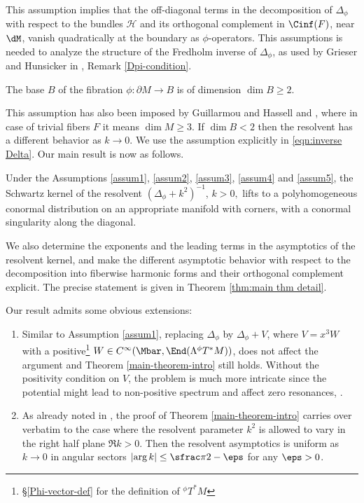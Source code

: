 This assumption implies that the off-diagonal terms in the decomposition of $\Delta_{\phi}$ with respect to the bundles $\mathscr{H}$ and its orthogonal complement in $\Cinf(F)$, near $\dM$, vanish quadratically at the boundary as $\phi$-operators. This assumptions is needed to analyze the structure of the Fredholm inverse of $\Delta_{\phi}$, as
used by Grieser and Hunsicker in \cite[Th.\,2]{grieser-para}, \cf Remark \ref{Dpi-condition}.

\begin{assum}\label{assum5}
The base $B$ of the fibration $\phi: \partial M \!\to\! B$ is of dimension \hbox{$\dim B \!\geq\! 2$}.
\end{assum}

This assumption has also been imposed by Guillarmou and Hassell
\cite{guillarmou2008resolvent} and \cite{guillarmou2009resolvent}, where
in case of trivial fibers $F$ it means $\dim M \geq 3$. If $\dim B<2$ then the resolvent has a different behavior as $k\to0$. We use the assumption explicitly in \eqref{eqn:inverse Delta}. Our main result is now as follows.

\begin{Th}\label{main-theorem-intro}
Under the Assumptions \ref{assum1}, \ref{assum2}, \ref{assum3}, \ref{assum4} and \ref{assum5},
the Schwartz kernel of the resolvent
$(\Delta_{\phi} + k^{2})^{-1}$, $k>0,$ lifts to a polyhomogeneous conormal
distribution on an appropriate manifold with corners,
with a conormal singularity along the diagonal.
\end{Th}
We also determine the exponents and the leading terms in the asymptotics of the resolvent kernel, and make the different asymptotic behavior with respect to the decomposition into fiberwise harmonic forms and their orthogonal complement explicit. The precise statement is given in Theorem \ref{thm:main thm detail}.

\begin{Rem}
Our result admits some obvious extensions:
\begin{enumerate}
\item Similar to Assumption \ref{assum1}, replacing $\Delta_\phi$ by $\Delta_\phi + V$, where
$V = x^3 W$ with a positive\footnote{\cf \S \ref{Phi-vector-def} for the definition of ${}^{\phi}T^*M$} $W \in C^\infty(\Mbar, \End(\Lambda{}^{\phi}T^*M))$,
does not affect the argument and Theorem \ref{main-theorem-intro} still holds. Without the positivity condition on $V$, the problem is much more
intricate since the potential might lead to non-positive spectrum and affect zero resonances, \cf \cite{guillarmou2009resolvent}.
\item As already noted in \cite[Th.\,6]{Sher}, the proof of Theorem \ref{main-theorem-intro} carries over verbatim to
the case where the resolvent parameter $k^2$ is allowed to vary in the right half plane $\Re k>0$. Then
the resolvent asymptotics is
uniform as $k\to0$ in angular sectors $\left|\arg k\right| \leq \sfrac\pi2-\eps$ for any $\eps>0$.
\end{enumerate}
\end{Rem}

